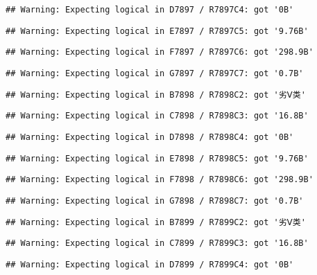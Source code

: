 \documentclass[
]{article}
\begin{document}
\begin{verbatim}
## Warning: Expecting logical in D7897 / R7897C4: got '0B'
\end{verbatim}

\begin{verbatim}
## Warning: Expecting logical in E7897 / R7897C5: got '9.76B'
\end{verbatim}

\begin{verbatim}
## Warning: Expecting logical in F7897 / R7897C6: got '298.9B'
\end{verbatim}

\begin{verbatim}
## Warning: Expecting logical in G7897 / R7897C7: got '0.7B'
\end{verbatim}

\begin{verbatim}
## Warning: Expecting logical in B7898 / R7898C2: got '劣Ⅴ类'
\end{verbatim}

\begin{verbatim}
## Warning: Expecting logical in C7898 / R7898C3: got '16.8B'
\end{verbatim}

\begin{verbatim}
## Warning: Expecting logical in D7898 / R7898C4: got '0B'
\end{verbatim}

\begin{verbatim}
## Warning: Expecting logical in E7898 / R7898C5: got '9.76B'
\end{verbatim}

\begin{verbatim}
## Warning: Expecting logical in F7898 / R7898C6: got '298.9B'
\end{verbatim}

\begin{verbatim}
## Warning: Expecting logical in G7898 / R7898C7: got '0.7B'
\end{verbatim}

\begin{verbatim}
## Warning: Expecting logical in B7899 / R7899C2: got '劣Ⅴ类'
\end{verbatim}

\begin{verbatim}
## Warning: Expecting logical in C7899 / R7899C3: got '16.8B'
\end{verbatim}

\begin{verbatim}
## Warning: Expecting logical in D7899 / R7899C4: got '0B'
\end{verbatim}
\end{document}
